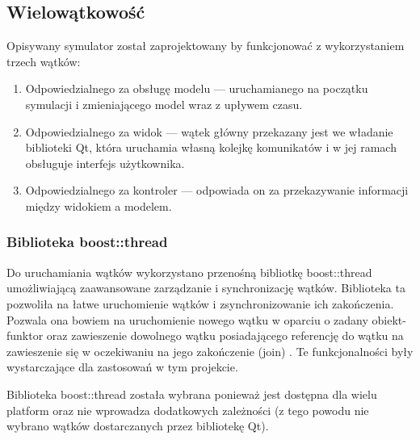 {\subsection{Wielowątkowość}
\par{
Opisywany symulator został zaprojektowany by funkcjonować z wykorzystaniem trzech wątków:
\begin{enumerate}
\item Odpowiedzialnego za obsługę modelu --- uruchamianego na początku symulacji i zmieniającego model wraz z upływem czasu.
\item Odpowiedzialnego za widok --- wątek główny przekazany jest we władanie biblioteki Qt, która uruchamia własną kolejkę komunikatów i w jej ramach obsługuje interfejs użytkownika.
\item Odpowiedzialnego za kontroler --- odpowiada on za przekazywanie informacji między widokiem a modelem.
\end{enumerate}
}
\subsubsection{Biblioteka boost::thread}
\par{
Do uruchamiania wątków wykorzystano przenośną bibliotkę boost::thread \cite{Boost} umożliwiającą zaawansowane zarządzanie i synchronizację wątków. Biblioteka ta pozwoliła na łatwe uruchomienie wątków i zsynchronizowanie ich zakończenia. Pozwala ona bowiem na uruchomienie nowego wątku w oparciu o zadany obiekt-funktor \cite{Boost} oraz zawieszenie dowolnego wątku posiadającego referencję do wątku na zawieszenie się w oczekiwaniu na jego zakończenie (join) \cite{Boost}. Te funkcjonalności były wystarczające dla zastosowań w tym projekcie.
}
\par{
Biblioteka boost::thread została wybrana ponieważ jest dostępna dla wielu platform oraz nie wprowadza dodatkowych zależności (z tego powodu nie wybrano wątków dostarczanych przez bibliotekę Qt).
}

}
